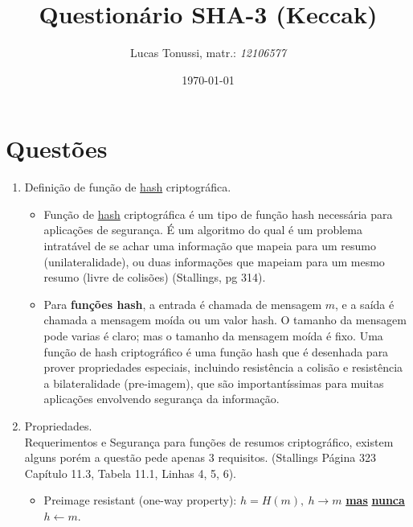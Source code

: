 \documentclass[12pt, a4paper]{article}
\title {
  {\Huge \textbf{Questionário} {\textsc{SHA-3} (Keccak)}}
}
\author {
  Lucas Tonussi, matr.: \textit{12106577}
}
\date{
  \today
}
\begin{document}
\maketitle

\section{Questões}

\begin{enumerate}

\item Definição de função de \underline{hash} criptográfica.\\

  \begin{itemize}

    \item Função de \underline{hash} criptográfica é um tipo de função hash
    necessária para aplicações de segurança. É um algoritmo do qual é um
    problema intratável de se achar uma informação que mapeia para um resumo
    (unilateralidade), ou duas informações que mapeiam para um mesmo resumo
    (livre de colisões) (Stallings, pg 314).\\

    \item Para \textbf{funções hash}, a entrada é chamada de mensagem $m$, e a
    saída é chamada a mensagem moída ou um valor hash. O tamanho da mensagem
    pode varias é claro; mas o tamanho da mensagem moída é fixo. Uma função de
    hash criptográfico é uma função hash que é desenhada para prover
    propriedades especiais, incluindo resistência a colisão e resistência a
    bilateralidade (pre-imagem), que são importantíssimas para muitas aplicações
    envolvendo segurança da informação.\\

  \end{itemize}

\item Propriedades.\\

Requerimentos e Segurança para funções de resumos criptográfico, existem alguns
porém a questão pede apenas 3  requisitos. (Stallings Página 323 Capítulo 11.3,
Tabela 11.1,  Linhas 4, 5, 6).\\

  \begin{itemize}
    \label{tiposataque}
    \item Preimage resistant (one-way property): $h = H(m),\ h \rightarrow m$
    \underline{\color{red} \textbf{mas}} \underline{\color{red} \textbf{nunca}}
    $h \leftarrow m$.\\


\end{itemize}
\end{enumerate}
\end{document}
